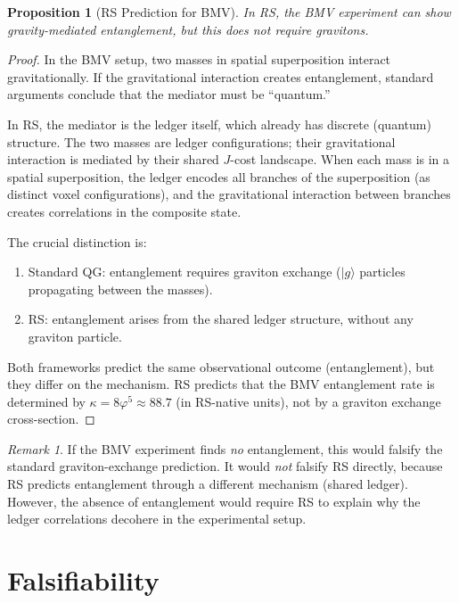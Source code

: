 \documentclass[12pt,a4paper]{article}
\newtheorem{proposition}[theorem]{Proposition}
\theoremstyle{definition}
\theoremstyle{remark}
\newtheorem{remark}[theorem]{Remark}
\begin{document}
\begin{proposition}[RS Prediction for BMV]
\label{prop:bmv}
In RS, the BMV experiment \emph{can} show gravity-mediated
entanglement, but this does not require gravitons.
\end{proposition}

\begin{proof}
In the BMV setup, two masses in spatial superposition interact
gravitationally.  If the gravitational interaction creates
entanglement, standard arguments conclude that the mediator must
be ``quantum.''

In RS, the mediator is the ledger itself, which already has
discrete (quantum) structure.  The two masses are ledger
configurations; their gravitational interaction is mediated by
their shared $J$-cost landscape.  When each mass is in a spatial
superposition, the ledger encodes all branches of the
superposition (as distinct voxel configurations), and the
gravitational interaction between branches creates correlations
in the composite state.

The crucial distinction is:
\begin{enumerate}[label=(\roman*)]
  \item Standard QG: entanglement requires graviton exchange
        ($|g\rangle$ particles propagating between the masses).
  \item RS: entanglement arises from the shared ledger structure,
        without any graviton particle.
\end{enumerate}
Both frameworks predict the same observational outcome
(entanglement), but they differ on the mechanism.  RS predicts
that the BMV entanglement rate is determined by $\kappa =
8\varphi^5 \approx 88.7$ (in RS-native units), not by a graviton
exchange cross-section.
\end{proof}

\begin{remark}
If the BMV experiment finds \emph{no} entanglement, this would
falsify the standard graviton-exchange prediction.  It would
\emph{not} falsify RS directly, because RS predicts entanglement
through a different mechanism (shared ledger).  However, the
absence of entanglement would require RS to explain why the
ledger correlations decohere in the experimental setup.
\end{remark}

\section{Falsifiability}
\label{sec:falsifiability}
\end{document}

